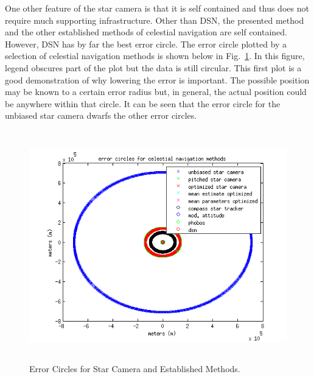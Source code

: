\documentclass[12pt,a4paper]{book}
\begin{document}
One other feature of the star camera is that it is self contained and thus does not require much supporting infrastructure.  Other than DSN, the presented method and the other established methods of celestial navigation are self contained.  However, DSN has by far the best error circle.  The error circle plotted by a selection of celestial navigation methods is shown below in Fig.~\ref{f:ecs}. In this figure, legend obscures part of the plot but the data is still circular.  This first plot is a good demonstration of why lowering the error is important.  The possible position may be known to a certain error radius but, in general, the actual position could be anywhere within that circle.  It can be seen that the error circle for the unbiased star camera dwarfs the other error circles.  
\begin{figure}[!ht]
\centering
\includegraphics[height=10cm]{errorCirclesFar.png}
\caption{Error Circles for Star Camera and Established Methods.}\label{f:ecs}
\end{figure}
\end{document}
